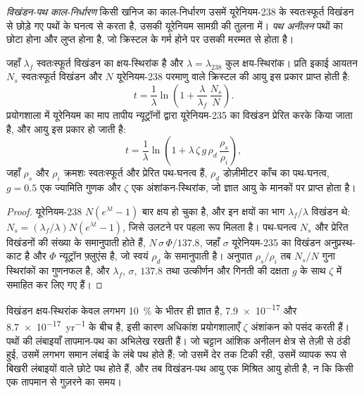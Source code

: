 \begin{definition}[विखंडन-पथ काल-निर्धारण, पथ अनीलन]\label{def:b3:advanced-geochronology:fission-track}
\emph{विखंडन-पथ काल-निर्धारण} किसी खनिज का काल-निर्धारण उसमें
यूरेनियम-238 के स्वतःस्फूर्त विखंडन से छोड़े गए पथों के घनत्व से करता है,
उसकी यूरेनियम सामग्री की तुलना में। \emph{पथ
अनीलन} पथों का छोटा होना और लुप्त होना है,
जो क्रिस्टल के गर्म होने पर उसकी मरम्मत से होता है।
\end{definition}

\begin{theorem}[विखंडन-पथ आयु]\label{thm:b3:advanced-geochronology:fission-track}
जहाँ $\lambda_f$ स्वतःस्फूर्त विखंडन का क्षय-स्थिरांक है और $\lambda =
\lambda_{238}$ कुल क्षय-स्थिरांक। प्रति इकाई आयतन $N_s$ स्वतःस्फूर्त विखंडन और $N$
यूरेनियम-238 परमाणु वाले क्रिस्टल की आयु इस प्रकार प्राप्त होती है:
\[
t = \frac1\lambda\ln\left(1 + \frac{\lambda}{\lambda_f}\,\frac{N_s}{N}\right).
\]
प्रयोगशाला में यूरेनियम का माप तापीय न्यूट्रॉनों द्वारा यूरेनियम-235 का विखंडन प्रेरित करके
किया जाता है, और आयु इस प्रकार हो जाती है:
\[
t = \frac1\lambda\ln\left(1 + \lambda\,\zeta\,g\,\rho_d\,\frac{\rho_s}{\rho_i}\right),
\]
जहाँ $\rho_s$ और $\rho_i$ क्रमशः स्वतःस्फूर्त और प्रेरित पथ-घनत्व हैं,
$\rho_d$ डोज़ीमीटर काँच का पथ-घनत्व, $g = 0.5$ एक ज्यामिति गुणक
और $\zeta$ एक अंशांकन-स्थिरांक, जो ज्ञात आयु के मानकों पर प्राप्त होता है।
\end{theorem}

\begin{proof}
यूरेनियम-238 $N(e^{\lambda t} - 1)$ बार क्षय हो चुका है, और
इन क्षयों का भाग $\lambda_f/\lambda$ विखंडन थे: $N_s =
(\lambda_f/\lambda)N(e^{\lambda t} - 1)$, जिसे उलटने पर पहला रूप मिलता है।
पथ-घनत्व $N_s$ और प्रेरित विखंडनों की संख्या के समानुपाती होते हैं,
$N\,\sigma\,\Phi/137.8$, जहाँ $\sigma$ यूरेनियम-235 का विखंडन अनुप्रस्थ-काट है
और $\Phi$ न्यूट्रॉन फ़्लुएंस है, जो स्वयं
$\rho_d$ के समानुपाती है। अनुपात $\rho_s/\rho_i$ तब $N_s/N$ गुना
स्थिरांकों का गुणनफल है, और $\lambda_f$, $\sigma$, $137.8$ तथा उत्कीर्णन और गिनती की दक्षता
$g$ के साथ $\zeta$ में समाहित कर लिए गए हैं।
\end{proof}

विखंडन क्षय-स्थिरांक केवल लगभग \qty{10}{\percent} के भीतर ही ज्ञात है,
\num{7.9e-17} और \qty{8.7e-17}{yr^{-1}} के बीच है, इसी कारण अधिकांश
प्रयोगशालाएँ $\zeta$ अंशांकन को पसंद करती हैं। पथों की लंबाइयाँ
तापमान-पथ का अभिलेख रखती हैं। जो चट्टान आंशिक अनीलन क्षेत्र से तेज़ी से ठंडी हुई,
उसमें लगभग समान लंबाई के लंबे पथ होते हैं; जो उसमें देर तक टिकी रही,
उसमें व्यापक रूप से बिखरी लंबाइयों वाले छोटे पथ होते हैं, और
तब विखंडन-पथ आयु एक मिश्रित आयु होती है, न कि किसी एक
तापमान से गुज़रने का समय।

